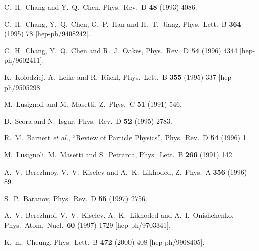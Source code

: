 \begin{thebibliography}{999}
C.~H.~Chang and Y.~Q.~Chen,
Phys.\ Rev.\ D {\bf 48} (1993) 4086.

C.~H.~Chang, Y.~Q.~Chen, G.~P.~Han and H.~T.~Jiang,
Phys.\ Lett.\ B {\bf 364} (1995) 78
[hep-ph/9408242].

C.~H.~Chang, Y.~Q.~Chen and R.~J.~Oakes,
Phys.\ Rev.\ D {\bf 54} (1996) 4344
[hep-ph/9602411].

K.~Kolodziej, A.~Leike and R.~R\"uckl,
Phys.\ Lett.\ B {\bf 355} (1995) 337
[hep-ph/9505298].

M.~Lusignoli and M.~Masetti,
Z.\ Phys.\ C {\bf 51} (1991) 546.

D.~Scora and N.~Isgur,
Phys.\ Rev.\ D {\bf 52} (1995) 2783.

R.~M.~Barnett {\it et al.}, ``Review of Particle Physics'',
Phys.\ Rev.\ D {\bf 54} (1996) 1.

M.~Lusignoli, M.~Masetti and S.~Petrarca,
Phys.\ Lett.\ B {\bf 266} (1991) 142.

A.~V.~Berezhnoy, V.~V.~Kiselev and A.~K.~Likhoded,
Z.\ Phys.\ A {\bf 356} (1996) 89.

S.~P.~Baranov,
Phys.\ Rev.\ D {\bf 55} (1997) 2756.

A.~V.~Berezhnoi, V.~V.~Kiselev, A.~K.~Likhoded and A.~I.~Onishchenko,
Phys.\ Atom.\ Nucl.\  {\bf 60} (1997) 1729
[hep-ph/9703341].

K.~m.~Cheung,
Phys.\ Lett.\ B {\bf 472} (2000) 408
[hep-ph/9908405].


\end{thebibliography}
